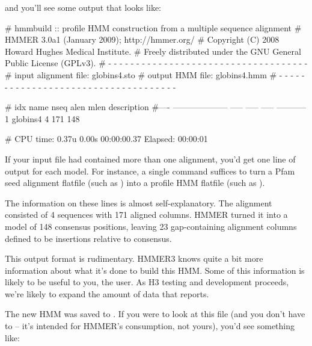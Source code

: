 
and you'll see some output that looks like:

\begin{sreoutput}
# hmmbuild :: profile HMM construction from a multiple sequence alignment
# HMMER 3.0a1 (January 2009); http://hmmer.org/
# Copyright (C) 2008 Howard Hughes Medical Institute.
# Freely distributed under the GNU General Public License (GPLv3).
# - - - - - - - - - - - - - - - - - - - - - - - - - - - - - - - - - - - -
# input alignment file:             globins4.sto
# output HMM file:                  globins4.hmm
# - - - - - - - - - - - - - - - - - - - - - - - - - - - - - - - - - - - -

# idx name                  nseq  alen  mlen  description
#---- -------------------- ----- ----- -----  -----------
1     globins4                 4   171   148

# CPU time: 0.37u 0.00s 00:00:00.37 Elapsed: 00:00:01
\end{sreoutput}


If your input file had contained more than one alignment, you'd get
one line of output for each model. For instance, a single
 command suffices to turn a Pfam seed alignment
flatfile (such as ) into a profile HMM flatfile
(such as ).

The information on these lines is almost self-explanatory. The
 alignment consisted of 4 sequences with 171 aligned
columns. HMMER turned it into a model of 148 consensus positions,
leaving 23 gap-containing alignment columns defined to be insertions
relative to consensus.

This output format is rudimentary.  HMMER3 knows quite a bit more
information about what it's done to build this HMM. Some of this
information is likely to be useful to you, the user. As H3 testing and
development proceeds, we're likely to expand the amount of data that
 reports.

The new HMM was saved to . If you were to look at
this file (and you don't have to -- it's intended for HMMER's
consumption, not yours), you'd see something like:

